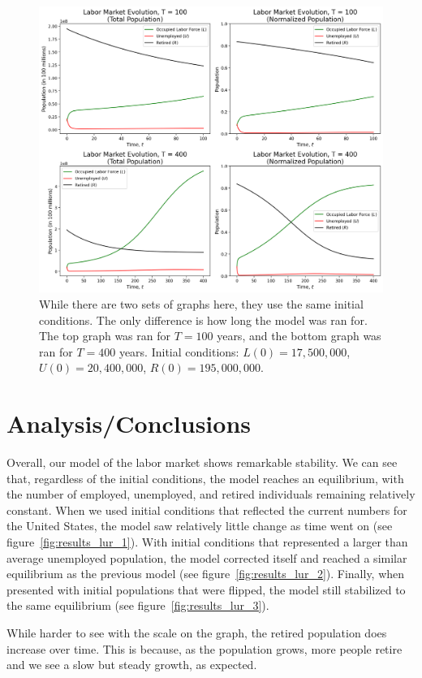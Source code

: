\documentclass[11pt]{amsart}
\begin{document}
\begin{figure}[h]
    \centering
    \includegraphics[width=\textwidth]{figures/results_lur_5.png}
    \caption{While there are two sets of graphs here, they use the same initial conditions.
            The only difference is how long the model was ran for. The top graph was ran for $T = 100$ years, and 
            the bottom graph was ran for $T = 400$ years.
            Initial conditions: $L(0) = 17,500,000$, $U(0) = 20,400,000$, $R(0) = 195,000,000$.}
    \label{fig:results_lur_5}
\end{figure}



\section{Analysis/Conclusions}

Overall, our model of the labor market shows remarkable stability. 
We can see that, regardless of the initial conditions, the model reaches an equilibrium, 
with the number of employed, unemployed, and retired individuals remaining relatively constant.
When we used initial conditions that reflected the current numbers for the United States,
the model saw relatively little change as time went on (see figure~\ref{fig:results_lur_1}).
With initial conditions that represented a larger than average unemployed population, the model corrected itself and reached a
similar equilibrium as the previous model (see figure~\ref{fig:results_lur_2}).
Finally, when presented with initial populations that were flipped, the model still stabilized to the same equilibrium
(see figure~\ref{fig:results_lur_3}).

While harder to see with the scale on the graph, the retired population does increase over time. 
This is because, as the population grows, more people retire and we see a slow but steady growth, as expected.



\newpage 


\end{document}
